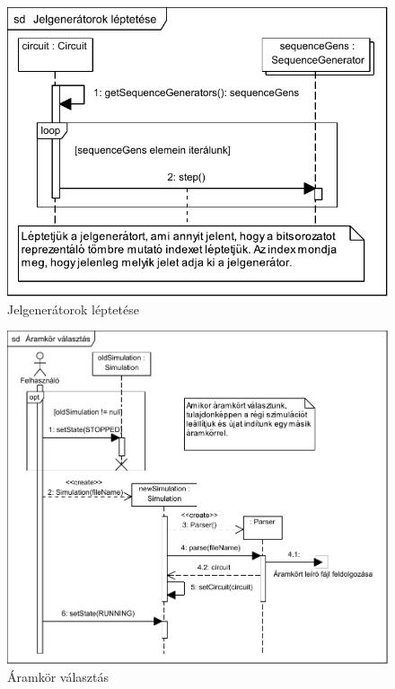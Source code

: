 \begin{figure}[H]
\begin{center}
\includegraphics{chapters/chapter03/seqdiagrams/sim_stepGenerators.pdf}
\caption{Jelgenerátorok léptetése}
\label{fig:sim_stepGenerators}
\end{center}
\end{figure}

\begin{figure}[H]
\begin{center}
\includegraphics{chapters/chapter03/seqdiagrams/aramkor_valasztas.pdf}
\caption{Áramkör választás}
\label{fig:aramkor_valasztas}
\end{center}
\end{figure}

